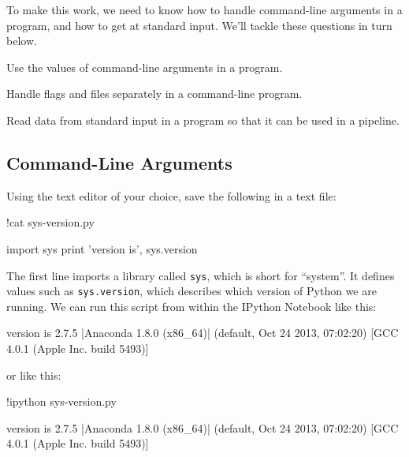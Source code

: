 \documentclass{book}
\begin{document}
To make this work, we need to know how to handle command-line arguments
in a program, and how to get at standard input. We'll tackle these
questions in turn below.

\begin{objectives}
\begin{swcitemize}
\item
  Use the values of command-line arguments in a program.
\item
  Handle flags and files separately in a command-line program.
\item
  Read data from standard input in a program so that it can be used in a
  pipeline.
\end{swcitemize}
\end{objectives}

\subsection{Command-Line Arguments}

Using the text editor of your choice, save the following in a text file:

\begin{VerbIn}
!cat sys-version.py
\end{VerbIn}

\begin{VerbIn}
import sys
print 'version is', sys.version
\end{VerbIn}

The first line imports a library called \texttt{sys}, which is short for
``system''. It defines values such as \texttt{sys.version}, which
describes which version of Python we are running. We can run this script
from within the IPython Notebook like this:

\begin{VerbIn}
\end{VerbIn}

\begin{VerbOut}
version is 2.7.5 |Anaconda 1.8.0 (x86_64)| (default, Oct 24 2013, 07:02:20)
[GCC 4.0.1 (Apple Inc. build 5493)]
\end{VerbOut}

or like this:

\begin{VerbIn}
!ipython sys-version.py
\end{VerbIn}

\begin{VerbOut}
version is 2.7.5 |Anaconda 1.8.0 (x86_64)| (default, Oct 24 2013, 07:02:20)
[GCC 4.0.1 (Apple Inc. build 5493)]
\end{VerbOut}
\end{document}
